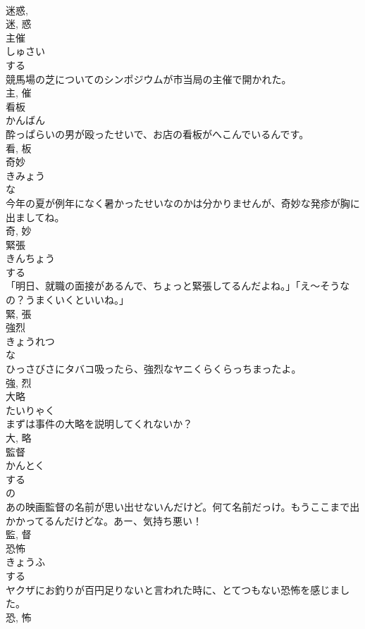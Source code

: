 \documentclass[8pt]{extreport}
\begin{document}
\begin{CJK}{UTF8}{min}
\\	迷惑, 
\\	迷, 惑	
\\	主催	
\\	しゅさい	
\\	する 
\\	競馬場の芝についてのシンポジウムが市当局の主催で開かれた。	
\\	主, 催	
\\	看板	
\\	かんばん	
\\	酔っぱらいの男が殴ったせいで、お店の看板がへこんでいるんです。	
\\	看, 板	
\\	奇妙	
\\	きみょう	
\\	な 
\\	今年の夏が例年になく暑かったせいなのかは分かりませんが、奇妙な発疹が胸に出ましてね。	
\\	奇, 妙	
\\	緊張	
\\	きんちょう	
\\	する 
\\	「明日、就職の面接があるんで、ちょっと緊張してるんだよね。」「え〜そうなの？うまくいくといいね。」	
\\	緊, 張	
\\	強烈	
\\	きょうれつ	
\\	な 
\\	ひっさびさにタバコ吸ったら、強烈なヤニくらくらっちまったよ。	
\\	強, 烈	
\\	大略	
\\	たいりゃく	
\\	まずは事件の大略を説明してくれないか？	
\\	大, 略	
\\	監督	
\\	かんとく	
\\	する 
\\	の 
\\	あの映画監督の名前が思い出せないんだけど。何て名前だっけ。もうここまで出かかってるんだけどな。あー、気持ち悪い！	
\\	監, 督	
\\	恐怖	
\\	きょうふ	
\\	する 
\\	ヤクザにお釣りが百円足りないと言われた時に、とてつもない恐怖を感じました。	
\\	恐, 怖	

\end{CJK}
\end{document}
